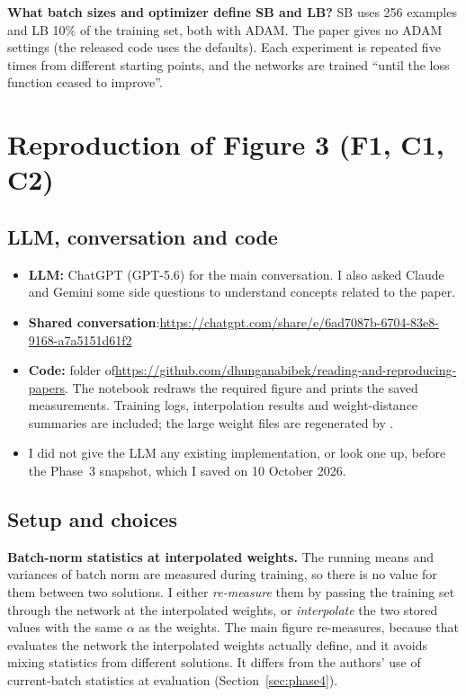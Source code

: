 \textbf{What batch sizes and optimizer define SB and LB?} SB uses 256 examples and LB 10\% of the training set, both with ADAM. The paper gives no ADAM settings (the released code uses the defaults). Each experiment is repeated five times from different starting points, and the networks are trained ``until the loss function ceased to improve''.

\section{Reproduction of Figure 3 (F1, C1, C2)}

\subsection{LLM, conversation and code}
\begin{itemize}
\item \textbf{LLM:} ChatGPT (GPT-5.6) for the main conversation. I also asked Claude and Gemini some side questions to understand concepts related to the paper.
\item \textbf{Shared conversation}:\newline \url{https://chatgpt.com/share/e/6ad7087b-6704-83e8-9168-a7a5151d61f2}
\item \textbf{Code:} folder  of\newline \url{https://github.com/dhunganabibek/reading-and-reproducing-papers}. The notebook  redraws the required figure and prints the saved measurements. Training logs, interpolation results and weight-distance summaries are included; the large weight files are regenerated by .
\item I did not give the LLM any existing implementation, or look one up, before the Phase~3 snapshot, which I saved on 10 October 2026.
\end{itemize}

\subsection{Setup and choices}

\textbf{Batch-norm statistics at interpolated weights.} The running means and variances of batch norm are measured during training, so there is no value for them between two solutions. I either \emph{re-measure} them by passing the training set through the network at the interpolated weights, or \emph{interpolate} the two stored values with the same $\alpha$ as the weights. The main figure re-measures, because that evaluates the network the interpolated weights actually define, and it avoids mixing statistics from different solutions. It differs from the authors' use of current-batch statistics at evaluation (Section~\ref{sec:phase4}).

